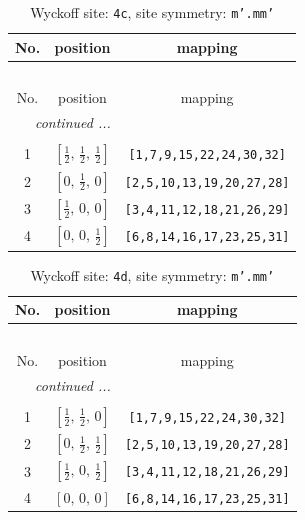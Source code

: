 \documentclass[fleqn,8pt]{jsarticle}
\begin{document}
\renewcommand{\arraystretch}{1.2}
\begin{longtable}{ccc}
\caption{Wyckoff site: {\tt 4c}, site symmetry: {\tt m'.mm'}}
 \\
 \hline \hline
No. & position & mapping \\ \hline \endfirsthead

\multicolumn{2}{l}{\tablename\ \thetable{}} \\
 \hline \hline
No. & position & mapping \\ \hline \endhead

 \hline \hline
\multicolumn{2}{r}{\footnotesize\it continued ...} \\ \endfoot

 \hline \hline
\multicolumn{2}{r}{} \\ \endlastfoot

1 & $\left[ \frac{1}{2},\, \frac{1}{2},\, \frac{1}{2} \right]$ & {\tt [1,7,9,15,22,24,30,32]} \\ \hline
2 & $\left[ 0,\, \frac{1}{2},\, 0 \right]$ & {\tt [2,5,10,13,19,20,27,28]} \\ \hline
3 & $\left[ \frac{1}{2},\, 0,\, 0 \right]$ & {\tt [3,4,11,12,18,21,26,29]} \\ \hline
4 & $\left[ 0,\, 0,\, \frac{1}{2} \right]$ & {\tt [6,8,14,16,17,23,25,31]} \\
\end{longtable}
\renewcommand{\arraystretch}{1.2}
\begin{longtable}{ccc}
\caption{Wyckoff site: {\tt 4d}, site symmetry: {\tt m'.mm'}}
 \\
 \hline \hline
No. & position & mapping \\ \hline \endfirsthead

\multicolumn{2}{l}{\tablename\ \thetable{}} \\
 \hline \hline
No. & position & mapping \\ \hline \endhead

 \hline \hline
\multicolumn{2}{r}{\footnotesize\it continued ...} \\ \endfoot

 \hline \hline
\multicolumn{2}{r}{} \\ \endlastfoot

1 & $\left[ \frac{1}{2},\, \frac{1}{2},\, 0 \right]$ & {\tt [1,7,9,15,22,24,30,32]} \\ \hline
2 & $\left[ 0,\, \frac{1}{2},\, \frac{1}{2} \right]$ & {\tt [2,5,10,13,19,20,27,28]} \\ \hline
3 & $\left[ \frac{1}{2},\, 0,\, \frac{1}{2} \right]$ & {\tt [3,4,11,12,18,21,26,29]} \\ \hline
4 & $\left[ 0,\, 0,\, 0 \right]$ & {\tt [6,8,14,16,17,23,25,31]} \\
\end{longtable}
\end{document}
